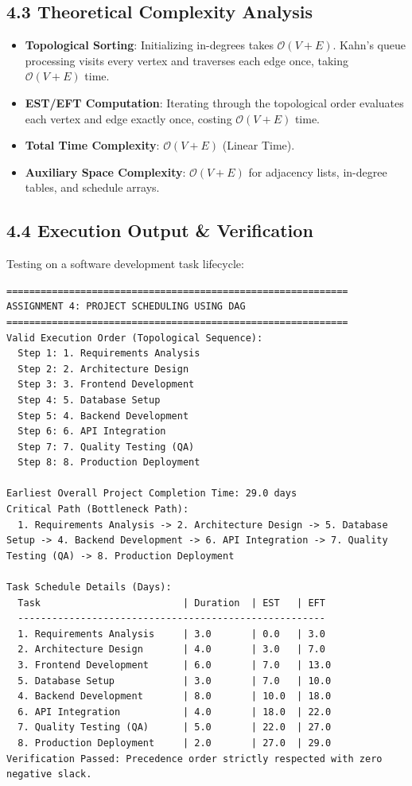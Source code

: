 \documentclass[12pt]{article}
\begin{document}
\subsection*{4.3 Theoretical Complexity Analysis}
\begin{itemize}
    \item \textbf{Topological Sorting}: Initializing in-degrees takes $\mathcal{O}(V + E)$. Kahn's queue processing visits every vertex and traverses each edge once, taking $\mathcal{O}(V + E)$ time.
    \item \textbf{EST/EFT Computation}: Iterating through the topological order evaluates each vertex and edge exactly once, costing $\mathcal{O}(V + E)$ time.
    \item \textbf{Total Time Complexity}: $\mathcal{O}(V + E)$ (Linear Time).
    \item \textbf{Auxiliary Space Complexity}: $\mathcal{O}(V + E)$ for adjacency lists, in-degree tables, and schedule arrays.
\end{itemize}

\subsection*{4.4 Execution Output \& Verification}
Testing on a software development task lifecycle:
\begin{lstlisting}
============================================================
ASSIGNMENT 4: PROJECT SCHEDULING USING DAG
============================================================
Valid Execution Order (Topological Sequence):
  Step 1: 1. Requirements Analysis
  Step 2: 2. Architecture Design
  Step 3: 3. Frontend Development
  Step 4: 5. Database Setup
  Step 5: 4. Backend Development
  Step 6: 6. API Integration
  Step 7: 7. Quality Testing (QA)
  Step 8: 8. Production Deployment

Earliest Overall Project Completion Time: 29.0 days
Critical Path (Bottleneck Path):
  1. Requirements Analysis -> 2. Architecture Design -> 5. Database Setup -> 4. Backend Development -> 6. API Integration -> 7. Quality Testing (QA) -> 8. Production Deployment

Task Schedule Details (Days):
  Task                         | Duration  | EST   | EFT  
  ------------------------------------------------------
  1. Requirements Analysis     | 3.0       | 0.0   | 3.0  
  2. Architecture Design       | 4.0       | 3.0   | 7.0  
  3. Frontend Development      | 6.0       | 7.0   | 13.0 
  5. Database Setup            | 3.0       | 7.0   | 10.0 
  4. Backend Development       | 8.0       | 10.0  | 18.0 
  6. API Integration           | 4.0       | 18.0  | 22.0 
  7. Quality Testing (QA)      | 5.0       | 22.0  | 27.0 
  8. Production Deployment     | 2.0       | 27.0  | 29.0 
Verification Passed: Precedence order strictly respected with zero negative slack.
\end{lstlisting}
\end{document}
